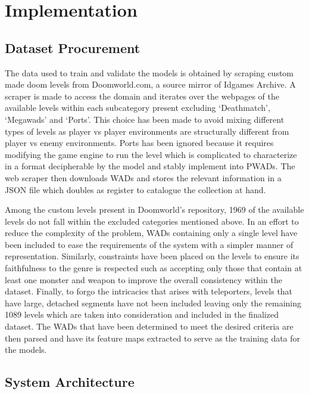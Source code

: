 \documentclass{Configuration_Files/PoliMi3i_thesis}
\begin{document}
\chapter{Implementation}
\label{ch:implementation}%

\section{Dataset Procurement}
The data used to train and validate the models is obtained by scraping custom made 
doom levels from Doomworld.com, a source mirror of Idgames Archive. A scraper 
is made to access the domain and iterates over the webpages of the available levels 
within each subcategory present excluding ‘Deathmatch’, ‘Megawads’ and ‘Ports’.
This choice has been made to avoid mixing different types of levels as player vs 
player environments are structurally different from player vs enemy environments. 
Ports has been ignored because it requires modifying the game engine to run the 
level which is complicated to characterize in a format decipherable by the model and 
stably implement into PWADs. The web scraper then downloads WADs and stores 
the relevant information in a JSON file which doubles as register to catalogue the 
collection at hand. 

Among the custom levels present in Doomworld’s repository, 1969 of the available 
levels do not fall within the excluded categories mentioned above. In an effort to 
reduce the complexity of the problem, WADs containing only a single level have 
been included to ease the requirements of the system with a simpler manner of 
representation. Similarly, constraints have been placed on the levels to ensure its 
faithfulness to the genre is respected such as accepting only those that contain at least 
one monster and weapon to improve the overall consistency within the dataset. 
Finally, to forgo the intricacies that arises with teleporters, levels that have large, 
detached segments have not been included leaving only the remaining 1089 levels
which are taken into consideration and included in the finalized dataset. The WADs 
that have been determined to meet the desired criteria are then parsed and have its 
feature maps extracted to serve as the training data for the models.
\newpage

\section{System Architecture}
\end{document}
